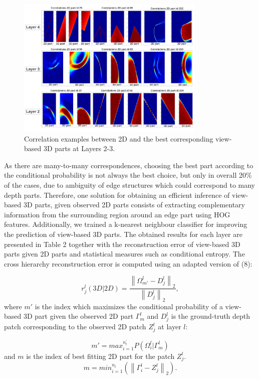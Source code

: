\documentclass[runningheads]{llncs}
\begin{document}
\begin{figure}
\begin{center}
\includegraphics[width=0.8\textwidth]{correlations_1_3}
\end{center}
\caption{Correlation examples between 2D and the best corresponding view-based 3D parts at Layers 2-3.}
\label{correlations}
\end{figure}

As there are many-to-many correspondences, choosing the best part according to the conditional probability is not always the best choice, but only in overall 20\% of the cases, due to ambiguity of edge structures which could correspond to many depth parts. Therefore, one solution for obtaining an efficient inference of view-based 3D parts, given observed 2D parts consists of extracting complementary information from the surrounding region around an edge part using HOG features. Additionally, we trained a k-nearest neighbour classifier for improving the prediction of view-based 3D parts. The obtained results for each layer are presented in Table 2 together with the reconstruction error of view-based 3D parts given 2D parts and statistical measures such as conditional entropy. The cross hierarchy reconstruction error is computed using an adapted version of (8):
 
\begin{equation}
 r_j^l(3D|2D) = \frac{\left\|\Omega_{m'}^l-D_j^l\right\|_2}{\left\|D_j^l\right\|_2}, 
\end{equation}
 where $m'$ is the index which maximizes the conditional probability of a view-based 3D part given the observed 2D part $\Gamma_m^l$ and $D_j^l$ is the ground-truth depth patch corresponding to the observed 2D patch $Z_j^l$ at layer $l$:
 
\begin{equation}
 m'=max_{i=1}^{n_l^{'}}P(\Omega_i^l|\Gamma_m^l)
\end{equation}
and $m$ is the index of best fitting 2D part for the patch $Z_j^l$.
\begin{equation}
 m=min_{i=1}^{n_l}(\left\|\Gamma_i^l-Z_j^l\right\|_2).
\end{equation}
\end{document}
